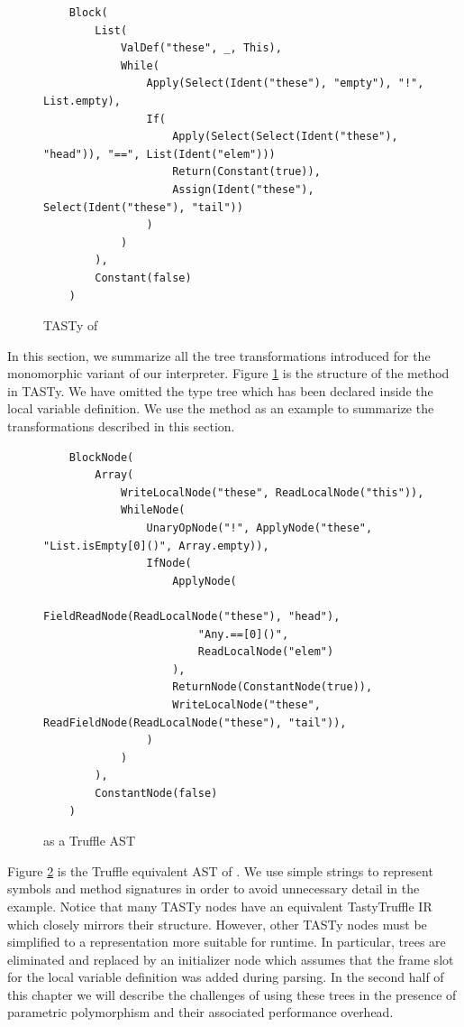\begin{figure}[!htb]
	\begin{verbatim}
	Block(
		List(
			ValDef("these", _, This),			
			While(
				Apply(Select(Ident("these"), "empty"), "!", List.empty),
				If(
					Apply(Select(Select(Ident("these"), "head")), "==", List(Ident("elem")))
					Return(Constant(true)),
					Assign(Ident("these"), Select(Ident("these"), "tail"))
				)	
			)   
		),
		Constant(false)
	)
	\end{verbatim}
	\caption{TASTy of }
	\label{tasty:list-contains}
\end{figure}

In this section, we summarize all the tree transformations introduced for the monomorphic variant of our interpreter.
Figure \ref{tasty:list-contains} is the structure of the  method in TASTy.
We have omitted the type tree which has been declared inside the local variable definition.
We use the  method as an example to summarize the transformations described in this section.

\begin{figure}[!htb]
	\begin{verbatim}
	BlockNode(
		Array(
			WriteLocalNode("these", ReadLocalNode("this")),
			WhileNode(
				UnaryOpNode("!", ApplyNode("these", "List.isEmpty[0]()", Array.empty)),
				IfNode(
					ApplyNode(
						FieldReadNode(ReadLocalNode("these"), "head"), 
						"Any.==[0]()", 
						ReadLocalNode("elem")
					),
					ReturnNode(ConstantNode(true)),
					WriteLocalNode("these", ReadFieldNode(ReadLocalNode("these"), "tail")),	
				)   
			)
		),
		ConstantNode(false)
	)
	\end{verbatim}
	\caption{ as a Truffle AST}
	\label{example:truffle-list-contains}
\end{figure}

Figure \ref{example:truffle-list-contains} is the Truffle equivalent AST of .
We use simple strings to represent symbols and method signatures in order to avoid unnecessary detail in the example.
Notice that many TASTy nodes have an equivalent TastyTruffle IR which closely mirrors their structure.
However, other TASTy nodes must be simplified to a representation more suitable for runtime.
In particular,  trees are eliminated and replaced by an initializer node which assumes that the frame slot for the local variable definition was added during parsing.
In the second half of this chapter we will describe the challenges of using these trees in the presence of parametric polymorphism and their associated performance overhead.

